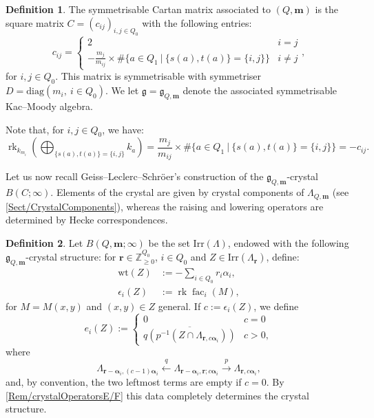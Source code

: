 \documentclass[a4paper,12pt]{article}
\theoremstyle{definition}
\newtheorem{definition}{Definition}[section]
\theoremstyle{plain}
\theoremstyle{remark}
\DeclareMathOperator{\fac}{fac}
\DeclareMathOperator{\rk}{rk}
\newcommand\bbZ{\mathbb{Z}}
\newcommand\bfalpha{\bm{\alpha}}
\newcommand\bfm{\mathbf{m}}
\newcommand\bfr{\mathbf{r}}
\begin{document}
\begin{definition}
The symmetrisable Cartan matrix associated to $(Q,\bfm)$ is the square matrix $C = (c_{ij})_{i,j \in Q_0}$ with the following entries:
\[
c_{ij}=
\left\{
\begin{array}{ll}
2 & i=j \\
-\frac{m_j}{m_{ij}}\times\#\{a\in Q_1\ \vert\ \{s(a),t(a)\}=\{i,j\}\} & i\ne j
\end{array}
\right.
,
\]
for $i,j\in Q_0$. This matrix is symmetrisable with symmetriser $D=\mathrm{diag}(m_i,\ i\in Q_0)$. We let $\mathfrak{g} = \mathfrak{g}_{Q,\bfm}$ denote the associated symmetrisable Kac--Moody algebra.
\end{definition}

Note that, for $i,j\in Q_0$, we have:
\[
\rk_{k_{m_i}}\left(\bigoplus_{\{s(a),t(a)\}=\{i,j\}}k_a\right)=\frac{m_j}{m_{ij}}\times\#\{a\in Q_1\ \vert\ \{s(a),t(a)\}=\{i,j\}\}=-c_{ij}.
\]

Let us now recall Geiss--Leclerc--Schr\"{o}er's construction of the $\mathfrak{g}_{Q,\bfm}$-crystal $B(C;\infty)$. Elements of the crystal are given by crystal components of $\Lambda_{Q,\bfm}$ (see \cref{Sect/CrystalComponents}), whereas the raising and lowering operators are determined by Hecke correspondences.

\begin{definition}\label{def/GeissLeclercSchröerCrystal}
\cite[\S 3.7, \S 5.3, Thm.\ 5.4]{GLS18a}
Let $B(Q,\bfm;\infty)$ be the set $\mathrm{Irr}(\Lambda)$, endowed with the following $\mathfrak{g}_{Q,\bfm}$-crystal structure: for $\bfr\in\bbZ_{\geq0}^{Q_0}$, $i\in Q_0$ and $Z\in\mathrm{Irr}(\Lambda_\bfr)$, define:
\begin{align*}
\mathrm{wt}(Z) & := -\sum_{i\in Q_0}r_i\alpha_i, \\
\epsilon_i(Z) & := \rk \fac_i(M),
\end{align*}
for $M=M(x,y)$ and $(x,y)\in Z$ general. If $c:=\epsilon_i(Z)$, we define
\[
e_i(Z):=
\left\{
\begin{array}{ll}
0 & c=0 \\
\overline{q(p^{-1}(Z\cap\Lambda_{\bfr,c\bfalpha_i}))} & c>0,
\end{array}
\right.
\]
where
\[
\Lambda_{\bfr-\bfalpha_i,(c-1)\bfalpha_i}\overset{q}{\longleftarrow}
\Lambda_{\bfr-\bfalpha_i,\bfr;c\bfalpha_i}\overset{p}{\longrightarrow}\Lambda_{\bfr,c\bfalpha_i}
,
\]
and, by convention, the two leftmost terms are empty if $c=0$. By \cref{Rem/crystalOperatorsE/F} this data completely determines the crystal structure.
\end{definition}
\end{document}
